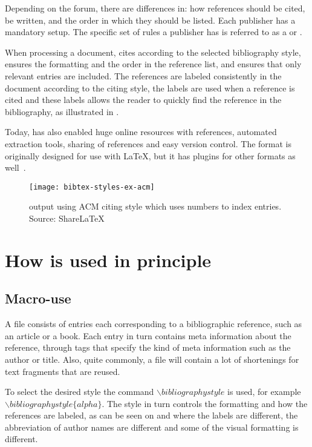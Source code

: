 Depending on the forum, there are differences in: how references
should be cited, be written, and the order in which they should be listed.
Each publisher has a mandatory setup.  The specific set of rules a
publisher has is referred to as a  or
.

When processing a document, {\bibtex} cites according to the selected
bibliography style, ensures the formatting and the order in the
reference list, and ensures that only relevant entries are included.
The references are labeled consistently in the document according to
the citing style, the labels are used when a reference is cited and
these labels allows the reader to quickly find the reference in the
bibliography, as illustrated in .

Today, {\bibtex} has also enabled huge online resources with
references, automated extraction tools, sharing of references and easy
version control.  The {\bibtex} format is originally designed for use
with {\LaTeX}, but it has plugins for other formats as
well~\cite{bibtex_resource}.

\begin{figure}
  \centering
  \texttt{[image: bibtex-styles-ex-acm]}
  \caption{{\bibtex} output using ACM citing style which uses numbers to
    index entries.  Source: ShareLaTeX~\cite{sharelatex2016_styles}}
\label{fig:bibtex_example_acm}
\end{figure}

\section{How {\bibtex} is used in principle}
\label{sec:practice_of_bibtex}

\subsection{Macro-use}

A {\bibtex} file consists of entries each corresponding to a
bibliographic reference, such as an article or a book.  Each entry in
turn contains meta information about the reference, through tags that
specify the kind of meta information such as the author or title.
Also, quite commonly, a file will contain a lot of shortenings for
text fragments that are reused.

To select the desired style the command
${\backslash}bibliographystyle$ is used, for example
${\backslash}bibliographystyle\{alpha\}$.  The style in turn controls
the formatting and how the references are labeled, as can be seen on
 and 
where the labels are different, the abbreviation of author names are
different and some of the visual formatting is different.

